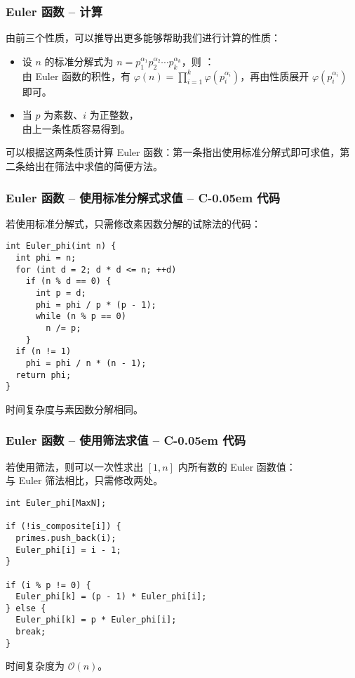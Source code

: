 \documentclass{../pkslide}
\newcommand{\Cpp}{\texorpdfstring{C\kern-0.05em\protect\raisebox{.35ex}{\textsmaller[2]{+\kern-0.05em+}}}{C++}}
\begin{document}
\begin{frame}
  \frametitle{Euler 函数 -- 计算}
  由前三个性质，可以推导出更多能够帮助我们进行计算的性质：
  
  \pause
  \begin{itemize}
    \item 设 $n$ 的标准分解式为 $n = p_1^{\alpha_1} p_2^{\alpha_2} \cdots p_k^{\alpha_k}$，则 ：\\
      由 Euler 函数的积性，有 $\varphi(n) = \prod_{i = 1}^{k} \varphi(p_i^{\alpha_i})$，再由性质展开 $\varphi(p_i^{\alpha_i})$ 即可。
      \pause
    \item 当 $p$ 为素数、$i$ 为正整数，\\
      由上一条性质容易得到。
  \end{itemize}
  
  \pause
  可以根据这两条性质计算 Euler 函数：第一条指出使用标准分解式即可求值，第二条给出在筛法中求值的简便方法。
\end{frame}

\begin{frame}[fragile]
  \frametitle{Euler 函数 -- 使用标准分解式求值 -- \Cpp{} 代码}
  
  若使用标准分解式，只需修改素因数分解的试除法的代码：
  
\begin{verbatim}
int Euler_phi(int n) {
  int phi = n;
  for (int d = 2; d * d <= n; ++d)
    if (n % d == 0) {
      int p = d;
      phi = phi / p * (p - 1);
      while (n % p == 0)
        n /= p;
    }
  if (n != 1)
    phi = phi / n * (n - 1);
  return phi;
}
\end{verbatim}
  
  时间复杂度与素因数分解相同。
\end{frame}

\begin{frame}[fragile]
\frametitle{Euler 函数 -- 使用筛法求值 -- \Cpp{} 代码}
  
  若使用筛法，则可以一次性求出 $[1, n]$ 内所有数的 Euler 函数值：\\
  与 Euler 筛法相比，只需修改两处。
  
\begin{verbatim}
int Euler_phi[MaxN];

if (!is_composite[i]) {
  primes.push_back(i);
  Euler_phi[i] = i - 1;
}

if (i % p != 0) {
  Euler_phi[k] = (p - 1) * Euler_phi[i];
} else {
  Euler_phi[k] = p * Euler_phi[i];
  break;
}
\end{verbatim}
  
  时间复杂度为 $\mathcal O (n)$。
\end{frame}
\end{document}
